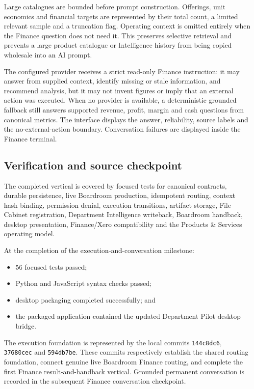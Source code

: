 Large catalogues are bounded before prompt construction.  Offerings, unit economics and financial targets are represented by their total count, a limited relevant sample and a truncation flag.  Operating context is omitted entirely when the Finance question does not need it.  This preserves selective retrieval and prevents a large product catalogue or Intelligence history from being copied wholesale into an AI prompt.

The configured provider receives a strict read-only Finance instruction: it may answer from supplied context, identify missing or stale information, and recommend analysis, but it may not invent figures or imply that an external action was executed.  When no provider is available, a deterministic grounded fallback still answers supported revenue, profit, margin and cash questions from canonical metrics.  The interface displays the answer, reliability, source labels and the no-external-action boundary.  Conversation failures are displayed inside the Finance terminal.

\subsection{Verification and source checkpoint}

The completed vertical is covered by focused tests for canonical contracts, durable persistence, live Boardroom production, idempotent routing, context hash binding, permission denial, execution transitions, artifact storage, File Cabinet registration, Department Intelligence writeback, Boardroom handback, desktop presentation, Finance/Xero compatibility and the Products \& Services operating model.

At the completion of the execution-and-conversation milestone:
\begin{itemize}
  \item 56 focused tests passed;
  \item Python and JavaScript syntax checks passed;
  \item desktop packaging completed successfully; and
  \item the packaged application contained the updated Department Pilot desktop bridge.
\end{itemize}

The execution foundation is represented by the local commits \texttt{144c8dc6}, \texttt{37680cec} and \texttt{594db7be}.  These commits respectively establish the shared routing foundation, connect genuine live Boardroom Finance routing, and complete the first Finance result-and-handback vertical.  Grounded permanent conversation is recorded in the subsequent Finance conversation checkpoint.

